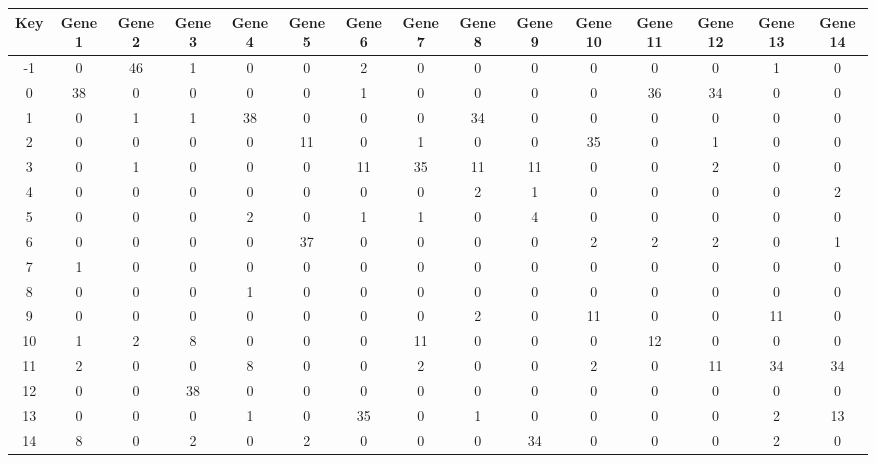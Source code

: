 \begin{tabular}{|c|c|c|c|c|c|c|c|c|c|c|c|c|c|c|}
\hline
Key & Gene 1 & Gene 2 & Gene 3 & Gene 4 & Gene 5 & Gene 6 & Gene 7 & Gene 8 & Gene 9 & Gene 10 & Gene 11 & Gene 12 & Gene 13 & Gene 14 \\
\hline
-1 & 0 & 46 & 1 & 0 & 0 & 2 & 0 & 0 & 0 & 0 & 0 & 0 & 1 & 0 \\
0 & 38 & 0 & 0 & 0 & 0 & 1 & 0 & 0 & 0 & 0 & 36 & 34 & 0 & 0 \\
1 & 0 & 1 & 1 & 38 & 0 & 0 & 0 & 34 & 0 & 0 & 0 & 0 & 0 & 0 \\
2 & 0 & 0 & 0 & 0 & 11 & 0 & 1 & 0 & 0 & 35 & 0 & 1 & 0 & 0 \\
3 & 0 & 1 & 0 & 0 & 0 & 11 & 35 & 11 & 11 & 0 & 0 & 2 & 0 & 0 \\
4 & 0 & 0 & 0 & 0 & 0 & 0 & 0 & 2 & 1 & 0 & 0 & 0 & 0 & 2 \\
5 & 0 & 0 & 0 & 2 & 0 & 1 & 1 & 0 & 4 & 0 & 0 & 0 & 0 & 0 \\
6 & 0 & 0 & 0 & 0 & 37 & 0 & 0 & 0 & 0 & 2 & 2 & 2 & 0 & 1 \\
7 & 1 & 0 & 0 & 0 & 0 & 0 & 0 & 0 & 0 & 0 & 0 & 0 & 0 & 0 \\
8 & 0 & 0 & 0 & 1 & 0 & 0 & 0 & 0 & 0 & 0 & 0 & 0 & 0 & 0 \\
9 & 0 & 0 & 0 & 0 & 0 & 0 & 0 & 2 & 0 & 11 & 0 & 0 & 11 & 0 \\
10 & 1 & 2 & 8 & 0 & 0 & 0 & 11 & 0 & 0 & 0 & 12 & 0 & 0 & 0 \\
11 & 2 & 0 & 0 & 8 & 0 & 0 & 2 & 0 & 0 & 2 & 0 & 11 & 34 & 34 \\
12 & 0 & 0 & 38 & 0 & 0 & 0 & 0 & 0 & 0 & 0 & 0 & 0 & 0 & 0 \\
13 & 0 & 0 & 0 & 1 & 0 & 35 & 0 & 1 & 0 & 0 & 0 & 0 & 2 & 13 \\
14 & 8 & 0 & 2 & 0 & 2 & 0 & 0 & 0 & 34 & 0 & 0 & 0 & 2 & 0 \\
\hline
\end{tabular}